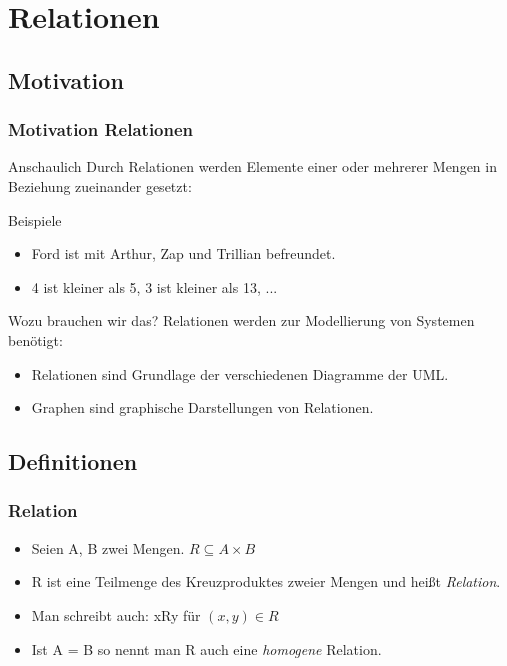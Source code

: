 \section{Relationen}
\subsection{Motivation}
\begin{frame}
	\frametitle{Motivation Relationen}
	\begin{alertblock}{Anschaulich}
		Durch Relationen werden Elemente einer oder mehrerer Mengen in Beziehung zueinander gesetzt:
	\end{alertblock}\pause
  \begin{exampleblock}{Beispiele}
		\begin{itemize}
			\item Ford ist mit Arthur, Zap und Trillian befreundet.
      \item 4 ist kleiner als 5, 3 ist kleiner als 13, ...
		\end{itemize}
  \end{exampleblock}\pause
	\begin{block}{Wozu brauchen wir das?}
		Relationen werden zur Modellierung von Systemen benötigt: \pause
		\begin{itemize}
			\item Relationen sind Grundlage der verschiedenen Diagramme der UML.
			\item Graphen sind graphische Darstellungen von Relationen.
		\end{itemize}
	\end{block}
\end{frame}

\subsection{Definitionen}
\begin{frame}
  \frametitle{Relation}
  \begin{definition}
    \begin{itemize}
      \item Seien A, B zwei Mengen. $ R \subseteq A \times B $
      \item R ist eine Teilmenge des Kreuzproduktes zweier Mengen und heißt \emph{Relation}.
      \item Man schreibt auch: xRy für $(x, y) \in R$
      \item Ist A = B so nennt man R auch eine \emph{homogene} Relation.
    \end{itemize}
  \end{definition}
\end{frame}

